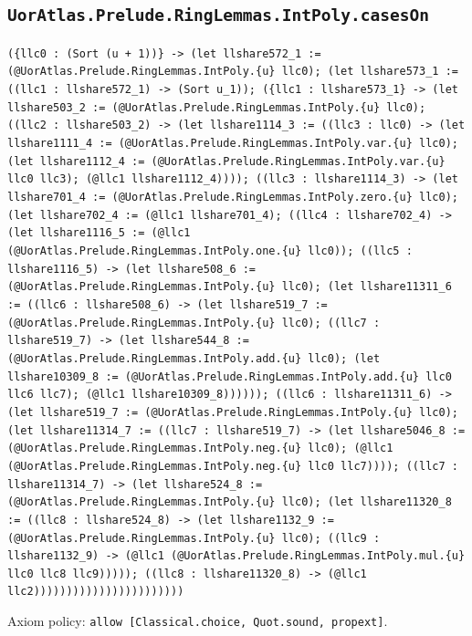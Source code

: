 \documentclass[11pt]{article}
\begin{document}
\subsection*{\texttt{UorAtlas.Prelude.RingLemmas.IntPoly.casesOn}}
\noindent\texttt{(\{llc0 : (Sort (u + 1))\} -> (let llshare572\_1 := (@UorAtlas.Prelude.RingLemmas.IntPoly.\{u\} llc0); (let llshare573\_1 := ((llc1 : llshare572\_1) -> (Sort u\_1)); (\{llc1 : llshare573\_1\} -> (let llshare503\_2 := (@UorAtlas.Prelude.RingLemmas.IntPoly.\{u\} llc0); ((llc2 : llshare503\_2) -> (let llshare1114\_3 := ((llc3 : llc0) -> (let llshare1111\_4 := (@UorAtlas.Prelude.RingLemmas.IntPoly.var.\{u\} llc0); (let llshare1112\_4 := (@UorAtlas.Prelude.RingLemmas.IntPoly.var.\{u\} llc0 llc3); (@llc1 llshare1112\_4)))); ((llc3 : llshare1114\_3) -> (let llshare701\_4 := (@UorAtlas.Prelude.RingLemmas.IntPoly.zero.\{u\} llc0); (let llshare702\_4 := (@llc1 llshare701\_4); ((llc4 : llshare702\_4) -> (let llshare1116\_5 := (@llc1 (@UorAtlas.Prelude.RingLemmas.IntPoly.one.\{u\} llc0)); ((llc5 : llshare1116\_5) -> (let llshare508\_6 := (@UorAtlas.Prelude.RingLemmas.IntPoly.\{u\} llc0); (let llshare11311\_6 := ((llc6 : llshare508\_6) -> (let llshare519\_7 := (@UorAtlas.Prelude.RingLemmas.IntPoly.\{u\} llc0); ((llc7 : llshare519\_7) -> (let llshare544\_8 := (@UorAtlas.Prelude.RingLemmas.IntPoly.add.\{u\} llc0); (let llshare10309\_8 := (@UorAtlas.Prelude.RingLemmas.IntPoly.add.\{u\} llc0 llc6 llc7); (@llc1 llshare10309\_8)))))); ((llc6 : llshare11311\_6) -> (let llshare519\_7 := (@UorAtlas.Prelude.RingLemmas.IntPoly.\{u\} llc0); (let llshare11314\_7 := ((llc7 : llshare519\_7) -> (let llshare5046\_8 := (@UorAtlas.Prelude.RingLemmas.IntPoly.neg.\{u\} llc0); (@llc1 (@UorAtlas.Prelude.RingLemmas.IntPoly.neg.\{u\} llc0 llc7)))); ((llc7 : llshare11314\_7) -> (let llshare524\_8 := (@UorAtlas.Prelude.RingLemmas.IntPoly.\{u\} llc0); (let llshare11320\_8 := ((llc8 : llshare524\_8) -> (let llshare1132\_9 := (@UorAtlas.Prelude.RingLemmas.IntPoly.\{u\} llc0); ((llc9 : llshare1132\_9) -> (@llc1 (@UorAtlas.Prelude.RingLemmas.IntPoly.mul.\{u\} llc0 llc8 llc9))))); ((llc8 : llshare11320\_8) -> (@llc1 llc2)))))))))))))))))))))))}\par
\noindent Axiom policy: \texttt{allow [Classical.choice, Quot.sound, propext]}.\par
\end{document}
